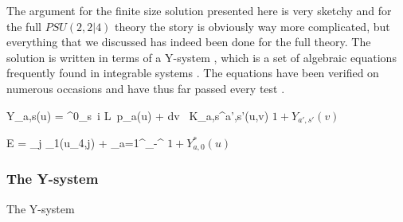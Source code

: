 The argument for the finite size solution presented here is very sketchy and for the full $PSU(2,2|4)$ theory the story is obviously way more complicated, but everything that we discussed has indeed been done for the full theory. The solution is written in terms of a Y-system \cite{Gromov:2009zb}, which is a set of algebraic equations frequently found in integrable systems \cite{Gromov:2010kf}. The  equations have been verified on numerous occasions and have thus far passed every test \cite{Gromov:2008gj}.

\beq
	\log Y_{a,s}(u) = \delta^0_s\, i L\, p_a(u) + \int dv \, K_{a,s}^{a',s'}(u,v) \log \( 1+Y_{a',s'}(v) \)
\eeq

\beq
	E = \sum_j \epsilon_1(u_{4,j}) + \sum_{a=1}^\infty \int_{-\infty}^\infty {}  \log \(1 + Y_{a,0}^* (u) \)
\eeq

\subsubsection{The Y-system}



The Y-system

